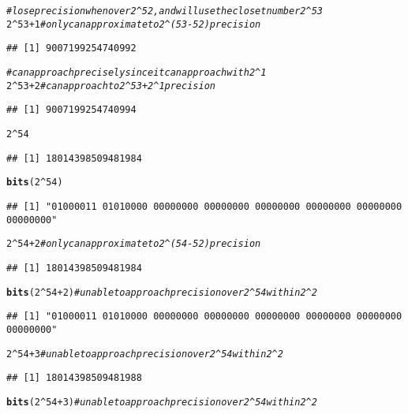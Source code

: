 \documentclass{article}\usepackage[]{graphicx}\usepackage[]{color}
\makeatletter
\newcommand{\hlnum}[1]{\textcolor[rgb]{0.686,0.059,0.569}{#1}}%
\newcommand{\hlcom}[1]{\textcolor[rgb]{0.678,0.584,0.686}{\textit{#1}}}%
\newcommand{\hlopt}[1]{\textcolor[rgb]{0,0,0}{#1}}%
\newcommand{\hlstd}[1]{\textcolor[rgb]{0.345,0.345,0.345}{#1}}%
\newcommand{\hlkwd}[1]{\textcolor[rgb]{0.737,0.353,0.396}{\textbf{#1}}}%
\newenvironment{kframe}{%
 \def\at@end@of@kframe{}%
 \ifinner\ifhmode%
  \def\at@end@of@kframe{\end{minipage}}%
  \begin{minipage}{\columnwidth}%
 \fi\fi%
 \def\FrameCommand##1{\hskip\@totalleftmargin \hskip-\fboxsep
 \colorbox{shadecolor}{##1}\hskip-\fboxsep
     \hskip-\linewidth \hskip-\@totalleftmargin \hskip\columnwidth}%
 \MakeFramed {\advance\hsize-\width
   \@totalleftmargin\z@ \linewidth\hsize
   \@setminipage}}%
 {\par\unskip\endMakeFramed%
 \at@end@of@kframe}
\newenvironment{knitrout}{}{} %
\makeatother
\begin{document}
\begin{knitrout}
\begin{kframe}
\begin{alltt}
\hlcom{# lose precision when over 2^52, and will use the closet number 2^53}
\hlnum{2}\hlopt{^}\hlnum{53} \hlopt{+} \hlnum{1}  \hlcom{#only can approximate to 2^(53-52) precision}
\end{alltt}
\begin{verbatim}
## [1] 9007199254740992
\end{verbatim}
\begin{alltt}
\hlcom{# can approach precisely since it can approach with 2^1}
\hlnum{2}\hlopt{^}\hlnum{53} \hlopt{+} \hlnum{2}  \hlcom{#can approach to 2^53+2^1 precision}
\end{alltt}
\begin{verbatim}
## [1] 9007199254740994
\end{verbatim}
\begin{alltt}
\hlnum{2}\hlopt{^}\hlnum{54}
\end{alltt}
\begin{verbatim}
## [1] 18014398509481984
\end{verbatim}
\begin{alltt}
\hlkwd{bits}\hlstd{(}\hlnum{2}\hlopt{^}\hlnum{54}\hlstd{)}
\end{alltt}
\begin{verbatim}
## [1] "01000011 01010000 00000000 00000000 00000000 00000000 00000000 00000000"
\end{verbatim}
\begin{alltt}
\hlnum{2}\hlopt{^}\hlnum{54} \hlopt{+} \hlnum{2}  \hlcom{#only can approximate to 2^(54-52) precision}
\end{alltt}
\begin{verbatim}
## [1] 18014398509481984
\end{verbatim}
\begin{alltt}
\hlkwd{bits}\hlstd{(}\hlnum{2}\hlopt{^}\hlnum{54} \hlopt{+} \hlnum{2}\hlstd{)}  \hlcom{#unable to approach precision over 2^54 within 2^2}
\end{alltt}
\begin{verbatim}
## [1] "01000011 01010000 00000000 00000000 00000000 00000000 00000000 00000000"
\end{verbatim}
\begin{alltt}
\hlnum{2}\hlopt{^}\hlnum{54} \hlopt{+} \hlnum{3}  \hlcom{#unable to approach precision over 2^54 within 2^2}
\end{alltt}
\begin{verbatim}
## [1] 18014398509481988
\end{verbatim}
\begin{alltt}
\hlkwd{bits}\hlstd{(}\hlnum{2}\hlopt{^}\hlnum{54} \hlopt{+} \hlnum{3}\hlstd{)}  \hlcom{#unable to approach precision over 2^54 within 2^2}

\end{alltt}
\end{kframe}
\end{knitrout}
\end{document}

